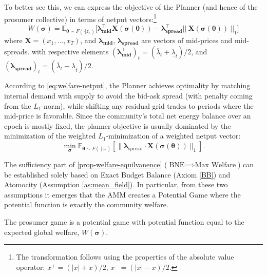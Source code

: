 \documentclass[12pt, notitlepage]{article}
\begin{document}
To better see this, we can express the objective of the Planner (and hence of the prosumer collective) in terms of netput vectors:\footnote{The transformation follows using the properties of the absolute value operator: $x^+ = (|x| + x)/2$, $x^- = (|x| - x)/2$.}     
\begin{equation} \label{eq:welfare-netput}
W(\boldsymbol{\sigma})= \mathbb{E}_{\boldsymbol{\theta} \sim F(\cdot|z_e)} \bigg[ \bm{\lambda}_{\textbf{mid}}^\top \mathbf{X}(\boldsymbol{\sigma}(\boldsymbol{\theta})) - \bm{\lambda}_{\mathbf{spread}}^\top || \ \mathbf{X} (\boldsymbol{\sigma}(\boldsymbol{\theta})) \  ||_1  \bigg]    
\end{equation}
where $\mathbf{X} = (x_1, \dots, x_T)$, and $\bm{\lambda}_{\textbf{mid}}$, $\bm{\lambda}_{\textbf{spread}}$ are vectors of mid-prices  and mid-spreads. with respective elements $(\boldsymbol{\lambda}_{\textbf{mid}}^\top)_t = (\overline{\lambda}_t + \underline{\lambda}_t)/2$, and  $  (\boldsymbol{\lambda}_{\textbf{spread}})_t = (\overline{\lambda}_t - \underline{\lambda}_t)/2$. 

According to \cref{eq:welfare-netput}, the Planner achieves optimality by matching internal demand with supply to avoid the bid-ask spread (with penalty coming from the $L_1$-norm), while shifting any residual grid trades to periods where the mid-price is favorable. Since the community's total net energy balance over an epoch is mostly fixed, the planner objective is usually dominated by the minimization of the weighted $L_1$-minimization of a weighted netput vector:
\[
\min_{\boldsymbol{\sigma}} \mathbb{E}_{\boldsymbol{\theta} \sim F(\cdot|z_e)} \left[ \big\| \boldsymbol{\lambda}_{\text{spread}} \cdot \mathbf{X}(\boldsymbol{\sigma}(\boldsymbol{\theta})) \big\|_1 \right].
\]



The sufficiency part of  \cref{prop-welfare-equilvanence} ($\text{BNE} \implies \text{Max Welfare}$) can be established solely based on Exact Budget Balance (Axiom \ref{BB}) and Atomocity (Assumption \ref{as:mean_field}). In particular, from these two assumptions it emerges that the AMM creates a Potential Game \citep{monderer1996} where the potential function is exactly the community welfare. 

\begin{proposition} \label{lemma-potential-game} The prosumer game is a potential game with potential function equal to the expected global welfare, $ W(\boldsymbol{\sigma})$.
\end{proposition}
\end{document}
